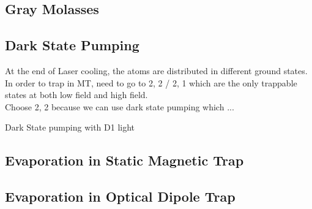 \subsection{Gray Molasses}\label{theory:gm}

\subsection{Dark State Pumping}\label{theory:pump}
At the end of Laser cooling, the atoms are distributed in different ground states.\\
In order to trap in MT, need to go to 2, 2 / 2, 1 which are the only trappable states at both low field and high field.\\
Choose 2, 2 because we can use dark state pumping which ...

Dark State pumping with D1 light

\subsection{Evaporation in Static Magnetic Trap}\label{theory:mt}

\subsection{Evaporation in Optical Dipole Trap}\label{theory:odt}
